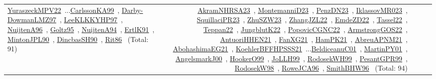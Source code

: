 {\begin{longtable}{p{3cm}r>{\raggedright\arraybackslash}p{6cm}>{\raggedright\arraybackslash}p{6cm}>{\raggedright\arraybackslash}p{8cm}}
\href{../works/YuraszeckMPV22.pdf}{YuraszeckMPV22}~\cite{YuraszeckMPV22}...\href{../works/CarlssonKA99.pdf}{CarlssonKA99}~\cite{CarlssonKA99}, \href{../works/Darby-DowmanLMZ97.pdf}{Darby-DowmanLMZ97}~\cite{Darby-DowmanLMZ97}, \href{../works/LeeKLKKYHP97.pdf}{LeeKLKKYHP97}~\cite{LeeKLKKYHP97}, \href{../works/NuijtenA96.pdf}{NuijtenA96}~\cite{NuijtenA96}, \href{../works/Goltz95.pdf}{Goltz95}~\cite{Goltz95}, \href{../works/NuijtenA94.pdf}{NuijtenA94}~\cite{NuijtenA94}, \href{../works/ErtlK91.pdf}{ErtlK91}~\cite{ErtlK91}, \href{../works/MintonJPL90.pdf}{MintonJPL90}~\cite{MintonJPL90}, \href{../works/DincbasSH90.pdf}{DincbasSH90}~\cite{DincbasSH90}, \href{../works/Rit86.pdf}{Rit86}~\cite{Rit86} (Total: 91) & \href{../works/AkramNHRSA23.pdf}{AkramNHRSA23}~\cite{AkramNHRSA23}, \href{../works/MontemanniD23.pdf}{MontemanniD23}~\cite{MontemanniD23}, \href{../works/PenzDN23.pdf}{PenzDN23}~\cite{PenzDN23}, \href{../works/IklassovMR023.pdf}{IklassovMR023}~\cite{IklassovMR023}, \href{../works/SquillaciPR23.pdf}{SquillaciPR23}~\cite{SquillaciPR23}, \href{../works/ZhuSZW23.pdf}{ZhuSZW23}~\cite{ZhuSZW23}, \href{../works/ZhangJZL22.pdf}{ZhangJZL22}~\cite{ZhangJZL22}, \href{../works/EmdeZD22.pdf}{EmdeZD22}~\cite{EmdeZD22}, \href{../works/Tassel22.pdf}{Tassel22}~\cite{Tassel22}, \href{../works/Teppan22.pdf}{Teppan22}~\cite{Teppan22}, \href{../works/JungblutK22.pdf}{JungblutK22}~\cite{JungblutK22}, \href{../works/PopovicCGNC22.pdf}{PopovicCGNC22}~\cite{PopovicCGNC22}, \href{../works/ArmstrongGOS22.pdf}{ArmstrongGOS22}~\cite{ArmstrongGOS22}, \href{../works/AntuoriHHEN21.pdf}{AntuoriHHEN21}~\cite{AntuoriHHEN21}, \href{../works/FanXG21.pdf}{FanXG21}~\cite{FanXG21}, \href{../works/HamPK21.pdf}{HamPK21}~\cite{HamPK21}, \href{../works/AbreuAPNM21.pdf}{AbreuAPNM21}~\cite{AbreuAPNM21}, \href{../works/AbohashimaEG21.pdf}{AbohashimaEG21}~\cite{AbohashimaEG21}, \href{../works/KoehlerBFFHPSSS21.pdf}{KoehlerBFFHPSSS21}~\cite{KoehlerBFFHPSSS21}...\href{../works/BeldiceanuC01.pdf}{BeldiceanuC01}~\cite{BeldiceanuC01}, \href{../works/MartinPY01.pdf}{MartinPY01}~\cite{MartinPY01}, \href{../works/AngelsmarkJ00.pdf}{AngelsmarkJ00}~\cite{AngelsmarkJ00}, \href{../works/HookerO99.pdf}{HookerO99}~\cite{HookerO99}, \href{../works/JoLLH99.pdf}{JoLLH99}~\cite{JoLLH99}, \href{../works/RodosekWH99.pdf}{RodosekWH99}~\cite{RodosekWH99}, \href{../works/PesantGPR99.pdf}{PesantGPR99}~\cite{PesantGPR99}, \href{../works/RodosekW98.pdf}{RodosekW98}~\cite{RodosekW98}, \href{../works/RoweJCA96.pdf}{RoweJCA96}~\cite{RoweJCA96}, \href{../works/SmithBHW96.pdf}{SmithBHW96}~\cite{SmithBHW96} (Total: 94)\\

\end{longtable}}
